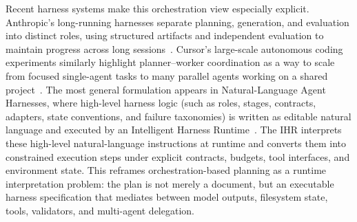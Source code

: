Recent harness systems make this orchestration view especially explicit. Anthropic's long-running harnesses separate planning, generation, and evaluation into distinct roles, using structured artifacts and independent evaluation to maintain progress across long sessions~\cite{anthropic2025longrunning,anthropic2026longrunningapps}. Cursor's large-scale autonomous coding experiments similarly highlight planner--worker coordination as a way to scale from focused single-agent tasks to many parallel agents working on a shared project~\cite{cursor2026scalingagents}. The most general formulation appears in Natural-Language Agent Harnesses, where high-level harness logic (such as roles, stages, contracts, adapters, state conventions, and failure taxonomies) is written as editable natural language and executed by an Intelligent Harness Runtime~\cite{pan2026nlah}. The IHR interprets these high-level natural-language instructions at runtime and converts them into constrained execution steps under explicit contracts, budgets, tool interfaces, and environment state. This reframes orchestration-based planning as a runtime interpretation problem: the plan is not merely a document, but an executable harness specification that mediates between model outputs, filesystem state, tools, validators, and multi-agent delegation.




